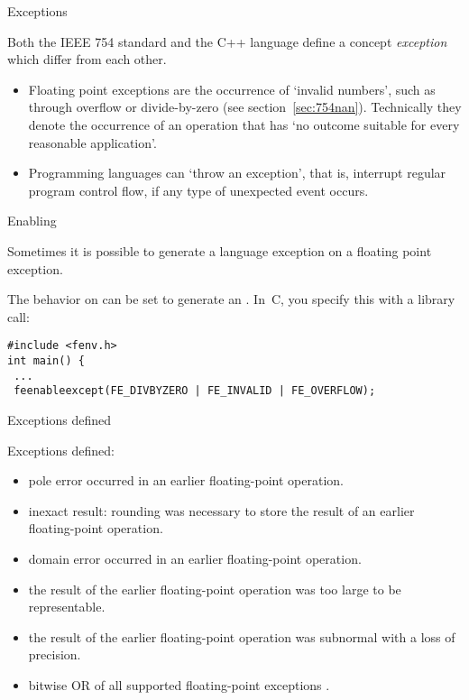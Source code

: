 \lstset{language=C}

 {Exceptions}
\label{sec:catch-exp}

Both the IEEE 754 standard and the C++ language define a concept
\emph{exception} which differ from each
other.
\begin{itemize}
\item Floating point exceptions are the occurrence of `invalid numbers',
  such as through overflow or divide-by-zero (see section~\ref{sec:754nan}).
  Technically they denote the occurrence of an operation that has `no outcome
suitable for every reasonable application'. 
\item Programming languages can `throw an exception', that is, interrupt regular
  program control flow, if any type of unexpected event occurs.
\end{itemize}

 {Enabling}

Sometimes it is possible to generate a language exception
on a floating point exception.


The behavior on  can be set to generate an
.
In~C, you specify this with a library call:
\begin{verbatim}
#include <fenv.h>
int main() { 
 ...
 feenableexcept(FE_DIVBYZERO | FE_INVALID | FE_OVERFLOW);
\end{verbatim}


 {Exceptions defined}

Exceptions defined:
\begin{itemize}
\item {} pole error occurred in an earlier
  floating-point operation.
\item {} inexact result: rounding was
  necessary to store the result of an earlier floating-point
  operation.
\item {} domain error occurred in an earlier
  floating-point operation.
\item {} the result of the earlier
  floating-point operation was too large to be representable.
\item {} the result of the earlier
  floating-point operation was subnormal with a loss of precision.
\item {} bitwise OR of all supported
  floating-point exceptions .
\end{itemize}

